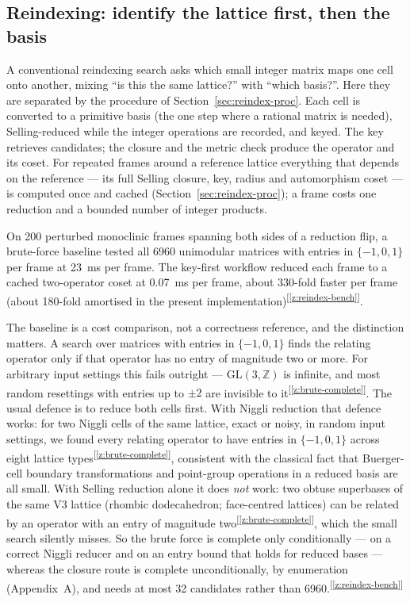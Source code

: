 \documentclass[11pt]{article}
\newcommand{\chk}[1]{\textsuperscript{[\ref{#1}]}}
\begin{document}

\subsection{Reindexing: identify the lattice first, then the basis}

A conventional reindexing search asks which small integer matrix maps one cell onto another, mixing ``is this the same lattice?'' with ``which basis?''. Here they are separated by the procedure of Section~\ref{sec:reindex-proc}. Each cell is converted to a primitive basis (the one step where a rational matrix is needed), Selling-reduced while the integer operations are recorded, and keyed. The key retrieves candidates; the closure and the metric check produce the operator and its coset. For repeated frames around a reference lattice everything that depends on the reference --- its full Selling closure, key, radius and automorphism coset --- is computed once and cached (Section~\ref{sec:reindex-proc}); a frame costs one reduction and a bounded number of integer products.

On 200 perturbed monoclinic frames spanning both sides of a reduction flip, a brute-force baseline tested all 6960 unimodular matrices with entries in $\{-1,0,1\}$ per frame at \SI{23}{\milli\second} per frame. The key-first workflow reduced each frame to a cached two-operator coset at \SI{0.07}{\milli\second} per frame, about 330-fold faster per frame (about 180-fold amortised in the present implementation)\chk{z:reindex-bench}.

The baseline is a cost comparison, not a correctness reference, and the distinction matters. A search over matrices with entries in $\{-1,0,1\}$ finds the relating operator only if that operator has no entry of magnitude two or more. For arbitrary input settings this fails outright --- $\mathrm{GL}(3,\mathbb Z)$ is infinite, and most random resettings with entries up to $\pm2$ are invisible to it\chk{z:brute-complete}. The usual defence is to reduce both cells first. With Niggli reduction that defence works: for two Niggli cells of the same lattice, exact or noisy, in random input settings, we found every relating operator to have entries in $\{-1,0,1\}$ across eight lattice types\chk{z:brute-complete}, consistent with the classical fact that Buerger-cell boundary transformations and point-group operations in a reduced basis are all small. With Selling reduction alone it does \emph{not} work: two obtuse superbases of the same V3 lattice (rhombic dodecahedron; face-centred lattices) can be related by an operator with an entry of magnitude two\chk{z:brute-complete}, which the small search silently misses. So the brute force is complete only conditionally --- on a correct Niggli reducer and on an entry bound that holds for reduced bases --- whereas the closure route is complete unconditionally, by enumeration (Appendix~A), and needs at most 32 candidates rather than 6960.\chk{z:reindex-bench}
\end{document}
